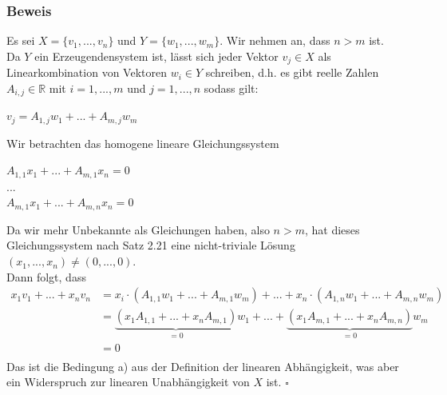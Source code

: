 \documentclass{article}
\begin{document}
\subsubsection*{Beweis}
Es sei $X = \{v_1,...,v_n\}$ und $Y = \{w_1,...,w_m\}$. Wir nehmen an, dass $n > m$ ist. \\
Da $Y$ ein Erzeugendensystem ist, lässt sich jeder Vektor $v_j \in X$ als Linearkombination von Vektoren $w_i \in Y$ schreiben, d.h. es gibt reelle Zahlen $A_{i,j} \in \mathbb{R}$ mit 
$i=1,...,m$ und $j=1,...,n$ sodass gilt: \\
\begin{center}
    $v_j = A_{1,j} w_1 + ... + A_{m,j} w_m$ \\
\end{center}
Wir betrachten das homogene lineare Gleichungssystem \\
\begin{center}
    $A_{1,1} x_1 + ... + A_{m,1} x_n = 0$ \\
    $...$ \\
    $A_{m,1} x_1 + ... + A_{m,n} x_n = 0$ \\
\end{center}
Da wir mehr Unbekannte als Gleichungen haben, also $n >m$, hat dieses Gleichungssystem nach Satz 2.21 eine nicht-triviale Lösung $(x_1,...,x_n) \neq (0,...,0)$. \\
Dann folgt, dass 
\begin{align*}
    x_1 v_1 + ... + x_n v_n &= x_i \cdot (A_{1,1} w_1 + ... + A_{m,1} w_m) + ... + x_n \cdot (A_{1,n} w_1 + ... + A_{m,n} w_m) \\
    &= \underbrace{(x_1 A_{1,1} + ... + x_n A_{m,1})}_{= 0} w_1 + ... + \underbrace{(x_1 A_{m,1} + ... + x_n A_{m,n})}_{= 0} w_m \\
    &= 0 \\
\end{align*}
Das ist die Bedingung a) aus der Definition der linearen Abhängigkeit, was aber ein Widerspruch zur linearen Unabhängigkeit von $X$ ist. $\square$ \\
\end{document}
